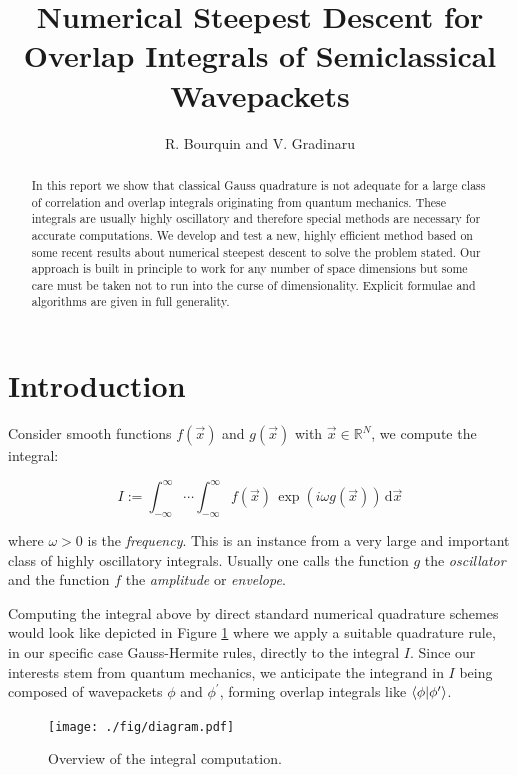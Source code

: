 \documentclass[a4paper,10pt]{article}
\title{Numerical Steepest Descent for Overlap Integrals of Semiclassical Wavepackets}
\author{R. Bourquin and V. Gradinaru}
\begin{document}
\maketitle

\begin{abstract}
  In this report we show that classical Gauss quadrature is not adequate for a large
  class of correlation and overlap integrals originating from quantum mechanics. These
  integrals are usually highly oscillatory and therefore special methods are necessary
  for accurate computations. We develop and test a new, highly efficient method based
  on some recent results about numerical steepest descent to solve the problem stated.
  Our approach is built in principle to work for any number of space dimensions but some
  care must be taken not to run into the curse of dimensionality. Explicit formulae and
  algorithms are given in full generality.
\end{abstract}


\section{Introduction}


Consider smooth functions $f(\vec{x})$ and $g(\vec{x})$ with $\vec{x} \in \mathbb{R}^N$,
we compute the integral:

\begin{equation} \label{eq:hoi}
 I := \int_{-\infty}^{\infty} \cdots \int_{-\infty}^{\infty}
      f(\vec{x}) \, \exp(i \omega g(\vec{x}))
      \, \mathrm{d} \vec{x}
\end{equation}

where $\omega > 0$ is the \emph{frequency}.
This is an instance from a very large and important class of highly oscillatory integrals.
Usually one calls the function $g$ the \emph{oscillator} and the function $f$ the
\emph{amplitude} or \emph{envelope}.

Computing the integral above by direct standard numerical quadrature schemes
would look like depicted in Figure \ref{fig:transformation_chain_1} where we apply a
suitable quadrature rule, in our specific case Gauss-Hermite rules, directly to the
integral $I$. Since our interests stem from quantum mechanics, we anticipate the
integrand in $I$ being composed of wavepackets $\phi$ and
$\phi^\prime$, forming overlap integrals like $\braket{\phi|\phi^\prime}$.

\begin{figure}[h!]
  \centering
  \texttt{[image: ./fig/diagram.pdf]}
  \caption{Overview of the integral computation.}
  \label{fig:transformation_chain_1}
\end{figure}
\end{document}
